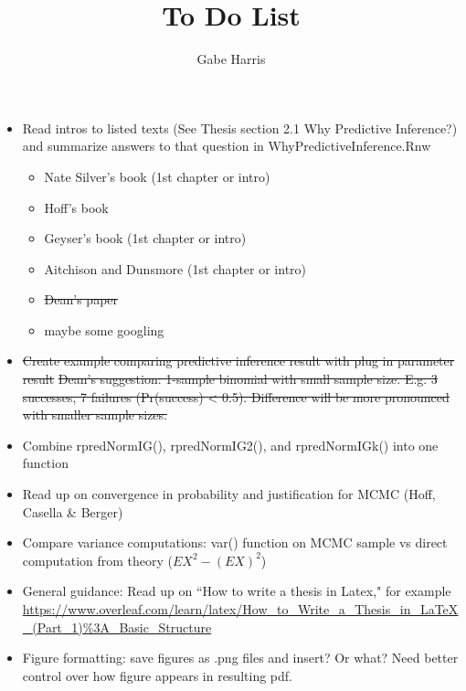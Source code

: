 \documentclass[12pt, a4paper]{article}
\begin{document}
% 
% 





\title{To Do List}
\author{\Large Gabe Harris}
\maketitle

\begin{itemize}
  \item Read intros to listed texts (See Thesis section 2.1 Why Predictive Inference?) and summarize answers to that question in WhyPredictiveInference.Rnw
    \begin{itemize}
      \item Nate Silver's book (1st chapter or intro)
      \item Hoff's book
      \item Geyser's book (1st chapter or intro)
      \item Aitchison and Dunsmore (1st chapter or intro)
      \item \sout{Dean's paper}
      \item maybe some googling
    \end{itemize}
  \item \sout{Create example comparing predictive inference result with plug in parameter result}
    \subitem \sout{Dean's suggestion:  1-sample binomial with small sample size.  E.g. 3 successes, 7 failures (Pr(success) < 0.5).  Difference will be more pronounced with smaller sample sizes.}
  \item Combine rpredNormIG(), rpredNormIG2(), and rpredNormIGk() into one function
  \item Read up on convergence in probability and justification for MCMC (Hoff, Casella \& Berger)
  \item Compare variance computations: var() function on MCMC sample vs direct computation from theory ($EX^2 - (EX)^2$)
  \item General guidance:  Read up on ``How to write a thesis in Latex," for example \url{https://www.overleaf.com/learn/latex/How_to_Write_a_Thesis_in_LaTeX_(Part_1)%3A_Basic_Structure}
  \item Figure formatting:  save figures as .png files and insert?  Or what?  Need better control over how figure appears in resulting pdf.
\end{itemize}
\end{document}

